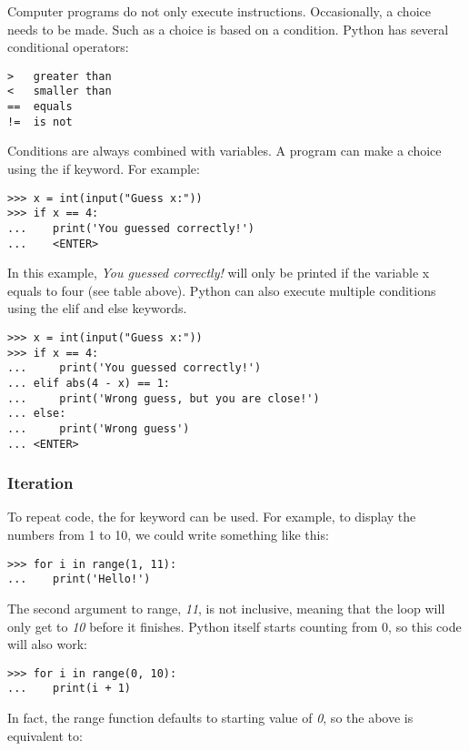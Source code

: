 Computer programs do not only execute instructions. Occasionally, a
choice needs to be made. Such as a choice is based on a condition.
Python has several conditional operators:

\begin{verbatim}
>   greater than
<   smaller than
==  equals
!=  is not
\end{verbatim}

Conditions are always combined with variables. A program can make a
choice using the if keyword. For example:

\begin{verbatim}
>>> x = int(input("Guess x:"))
>>> if x == 4:
...    print('You guessed correctly!')
...    <ENTER>
\end{verbatim}

In this example, \emph{You guessed correctly!} will only be printed if
the variable x equals to four (see table above). Python can also execute
multiple conditions using the elif and else keywords.

\begin{verbatim}
>>> x = int(input("Guess x:"))
>>> if x == 4:
...     print('You guessed correctly!')
... elif abs(4 - x) == 1:
...     print('Wrong guess, but you are close!')
... else:
...     print('Wrong guess')
... <ENTER>
\end{verbatim}

\subsubsection{Iteration}\label{iteration}

To repeat code, the for keyword can be used. For example, to display the
numbers from 1 to 10, we could write something like this:

\begin{verbatim}
>>> for i in range(1, 11):
...    print('Hello!')
\end{verbatim}

The second argument to range, \emph{11}, is not inclusive, meaning that
the loop will only get to \emph{10} before it finishes. Python itself
starts counting from 0, so this code will also work:

\begin{verbatim}
>>> for i in range(0, 10):
...    print(i + 1)
\end{verbatim}

In fact, the range function defaults to starting value of \emph{0}, so
the above is equivalent to:

